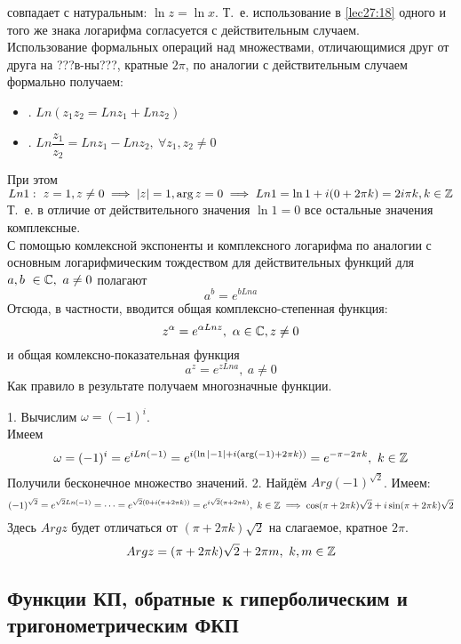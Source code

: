 \documentclass[../../main.tex]{subfiles}
\begin{document}
совпадает с натуральным: $ \ln z = \ln x $. Т.~е. использование в 
\eqref{lec27:18} одного и того же знака логарифма согласуется с действительным
случаем. \\
Использование формальных операций над множествами, отличающимися друг от друга
на ???в-ны???, кратные $ 2\pi $, по аналогии с действительным случаем 
формально
получаем:\\
\begin{itemize}
	\item. $Ln(z_1z_2 = Ln z_1 + Ln z_2)$
	\item. $Ln \dfrac{z_1}{z_2} = Ln z_1 - Ln z_2,\ \forall z_1, z_2 \neq 0$
\end{itemize}
При этом $ Ln 1:\ z = 1, z \neq 0 \implies |z| = 1, \arg z = 0 \implies 
Ln 1 = \ln 1 + i(0 + 2\pi k) = 2i\pi k, k\in\mathbb{Z}
$
Т.~е. в отличие от действительного значения $ \ln 1 = 0 $ все остальные 
значения комплексные.\\
С помощью комлексной экспоненты и комплексного логарифма по аналогии с 
основным
логарифмическим тождеством для действительных функций для 
$ a, b\ \in \mathbb{C},\ a \neq 0 $ полагают 
\begin{equation}
\label{lec27:20}
a^b = e^{b Ln a}
\end{equation}
Отсюда, в частности, вводится общая комплексно-степенная функция:
\begin{equation}
\label{lec27:21}
z^\alpha = e ^{\alpha Ln z},\ \alpha \in \mathbb{C}, z \neq 0
\end{equation}
и общая комлексно-показательная функция 
\begin{equation}
\label{lec27:22}
a^z = e^{z Ln a},\ a \neq 0
\end{equation}
Как правило в результате получаем многозначные функции.
\begin{exmps}
1. Вычислим $ \omega = (-1)^i $.\\
Имеем \[
\omega = (-1)^i = e^{i Ln(-1)} = 
e^{i(\ln |-1| + i(\arg(-1) + 2\pi k))} = 
e^{-\pi - 2\pi k},\ k \in \mathbb{Z}
\]
Получили бесконечное множество значений.
2. Найдём $ Arg(-1)^{\sqrt{2}} $. Имеем: \[
(-1)^{\sqrt{2}} = e^{\sqrt{2} Ln(-1)} = \dots =
e^{\sqrt{2}(0 + i(\pi + 2\pi k))} = 
e^{i\sqrt{2}(\pi + 2\pi k)},\ k \in \mathbb{Z} \implies
\cos (\pi + 2\pi k)\sqrt{2} + i\sin(\pi + 2\pi k)\sqrt{2}
\]
Здесь $ Arg z $ будет отличаться от $ (\pi + 2\pi k)\sqrt{2} $ на слагаемое, 
кратное $ 2\pi $.
\[
Arg z = (\pi + 2\pi k)\sqrt{2} + 2\pi m,\ k, m \in \Z
\]
\end{exmps}

\subsection{Функции КП, обратные к гиперболическим и тригонометрическим ФКП}
\end{document}

